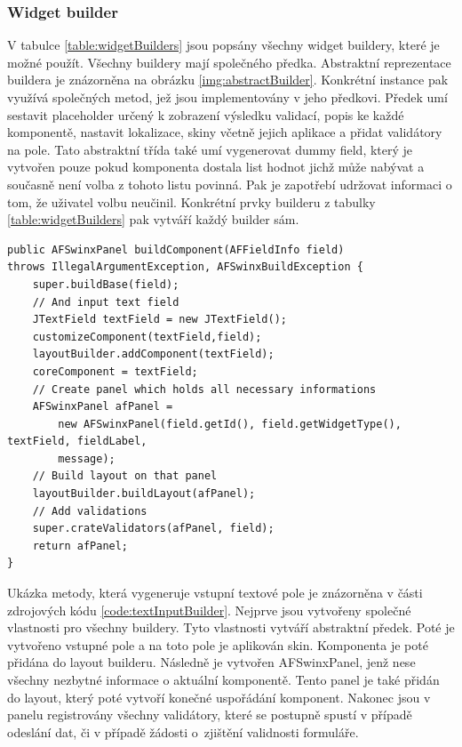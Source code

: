 \subsubsection{Widget builder}
V tabulce \ref{table:widgetBuilders} jsou popsány všechny widget buildery, které je možné použít. Všechny buildery mají společného předka. Abstraktní reprezentace buildera je znázorněna na obrázku \ref{img:abstractBuilder}. Konkrétní instance pak využívá společných metod, jež jsou implementovány v jeho předkovi. Předek umí sestavit placeholder určený k zobrazení výsledku validací, popis ke každé komponentě, nastavit lokalizace, skiny včetně jejich aplikace a přidat validátory na pole. Tato abstraktní třída také umí vygenerovat dummy field, který je vytvořen pouze pokud komponenta dostala list hodnot jichž může nabývat a současně není volba z tohoto listu povinná. Pak je zapotřebí udržovat informaci o tom, že uživatel volbu neučinil. Konkrétní prvky builderu z tabulky \ref{table:widgetBuilders} pak vytváří každý builder sám. 

\begin{lstlisting}[caption={Vytváření vstupního pole builderem.},
label={code:textInputBuilder}, basicstyle=\footnotesize]
public AFSwinxPanel buildComponent(AFFieldInfo field) 
throws IllegalArgumentException, AFSwinxBuildException {
	super.buildBase(field);
	// And input text field
	JTextField textField = new JTextField();
	customizeComponent(textField,field);
	layoutBuilder.addComponent(textField);
	coreComponent = textField;
	// Create panel which holds all necessary informations
	AFSwinxPanel afPanel =
		new AFSwinxPanel(field.getId(), field.getWidgetType(), textField, fieldLabel,
		message);
	// Build layout on that panel
	layoutBuilder.buildLayout(afPanel);
	// Add validations
	super.crateValidators(afPanel, field);
	return afPanel;
}
\end{lstlisting}

Ukázka metody, která vygeneruje vstupní textové pole je znázorněna v části zdrojových kódu \ref{code:textInputBuilder}. Nejprve jsou vytvořeny společné vlastnosti pro všechny buildery. Tyto vlastnosti vytváří abstraktní předek. Poté je vytvořeno vstupné pole a na toto pole je aplikován skin. Komponenta je poté přidána do layout builderu. Následně je vytvořen AFSwinxPanel, jenž nese všechny nezbytné informace o aktuální komponentě. Tento panel je také přidán do layout, který poté vytvoří konečné uspořádání komponent. Nakonec jsou v panelu registrovány všechny validátory, které se postupně spustí v případě odeslání dat, či v případě žádosti o~zjištění validnosti formuláře.

